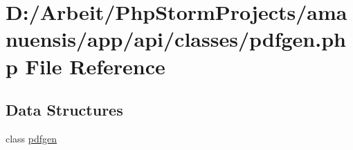 \hypertarget{a00069}{}\section{D\+:/\+Arbeit/\+Php\+Storm\+Projects/amanuensis/app/api/classes/pdfgen.php File Reference}
\label{a00069}
\subsection*{Data Structures}
\begin{DoxyCompactItemize}
\item 
class \hyperlink{a00035}{pdfgen}
\end{DoxyCompactItemize}
